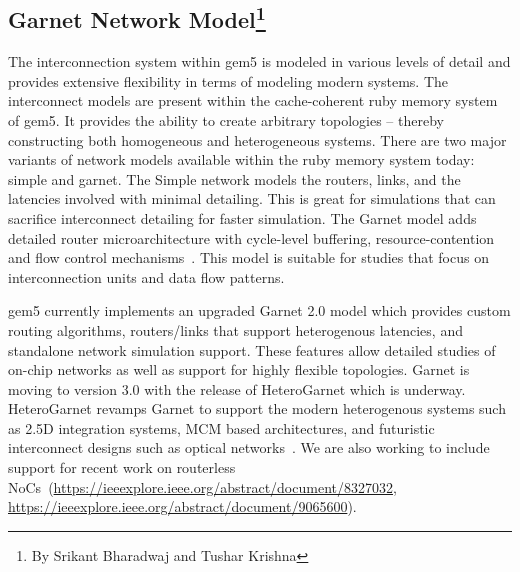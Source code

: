 \subsection[Garnet Network Model]{Garnet Network Model\footnote{By Srikant Bharadwaj and Tushar Krishna}}
\label{sec:garnet}

The interconnection system within gem5 is modeled in various levels of detail and provides extensive
flexibility in terms of modeling modern systems.
The interconnect models are present within the cache-coherent ruby memory system of gem5.
It provides the ability to create arbitrary topologies – thereby constructing both homogeneous and heterogeneous systems.
There are two major variants of network models available within the ruby memory system today: simple and garnet.
The Simple network models the routers, links, and the latencies involved with minimal detailing.
This is great for simulations that can sacrifice interconnect detailing for faster simulation.
The Garnet model adds detailed router microarchitecture with cycle-level buffering, resource-contention and flow control mechanisms~\cite{garnet-2}.
This model is suitable for studies that focus on interconnection units and data flow patterns.

gem5 currently implements an upgraded Garnet 2.0 model which provides custom routing algorithms, routers/links that support heterogenous latencies, and standalone network simulation support.
These features allow detailed studies of on-chip networks as well as support for highly flexible topologies.
Garnet is moving to version 3.0 with the release of HeteroGarnet which is underway.
HeteroGarnet revamps Garnet to support the modern heterogenous systems such as 2.5D integration systems, MCM based architectures, and futuristic interconnect designs such as optical networks~\cite{kite}.
We are also working to include support for recent work on routerless NoCs~\cite{}(\url{https://ieeexplore.ieee.org/abstract/document/8327032}, \url{https://ieeexplore.ieee.org/abstract/document/9065600}).

